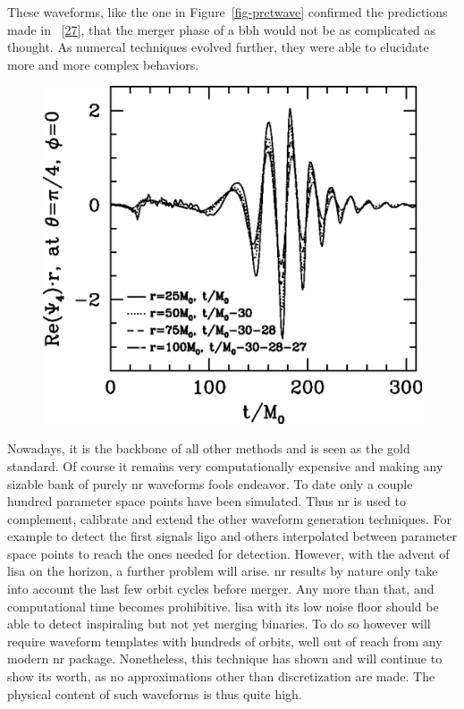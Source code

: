 \documentclass[
  10pt,
  a4paper,
  DIV=11,
  numbers=noendperiod,
  twoside]{scrreprt}
\DeclareRobustCommand{\[}{\begin{equation}}
\DeclareRobustCommand{\]}{\end{equation}}
\begin{document}
These waveforms, like the one in Figure~\ref{fig-pretwave} confirmed the
predictions made in ~{[}\protect\hyperlink{ref-Buonanno:2000ef}{27}{]},
that the merger phase of a \gls{bbh} would not be as complicated as
thought. As numercal techniques evolved further, they were able to
elucidate more and more complex behaviors.

\begin{figure}


{\centering \includegraphics{./pretwave.png}

}

\end{figure}

Nowadays, it is the backbone of all other methods and is seen as the
gold standard. Of course it remains very computationally expensive and
making any sizable bank of purely \gls{nr} waveforms fools endeavor. To
date only a couple hundred parameter space points have been simulated.
Thus \gls{nr} is used to complement, calibrate and extend the other
waveform generation techniques. For example to detect the first signals
\gls{ligo} and others interpolated between parameter space points to
reach the ones needed for detection. However, with the advent of
\gls{lisa} on the horizon, a further problem will arise. \gls{nr}
results by nature only take into account the last few orbit cycles
before merger. Any more than that, and computational time becomes
prohibitive. \gls{lisa} with its low noise floor should be able to
detect inspiraling but not yet merging binaries. To do so however will
require waveform templates with hundreds of orbits, well out of reach
from any modern \gls{nr} package. Nonetheless, this technique has shown
and will continue to show its worth, as no approximations other than
discretization are made. The physical content of such waveforms is thus
quite high.
\end{document}
